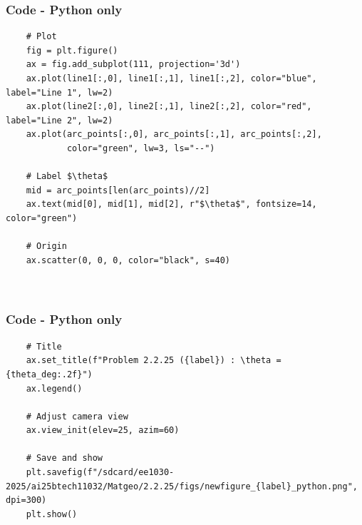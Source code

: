 \documentclass{beamer}
\theoremstyle{remark}
\numberwithin{equation}{section}
\begin{document}
\begin{frame}[fragile]
\frametitle{Code - Python only}
\begin{lstlisting}
    # Plot
    fig = plt.figure()
    ax = fig.add_subplot(111, projection='3d')
    ax.plot(line1[:,0], line1[:,1], line1[:,2], color="blue", label="Line 1", lw=2)
    ax.plot(line2[:,0], line2[:,1], line2[:,2], color="red", label="Line 2", lw=2)
    ax.plot(arc_points[:,0], arc_points[:,1], arc_points[:,2],
            color="green", lw=3, ls="--")

    # Label $\theta$
    mid = arc_points[len(arc_points)//2]
    ax.text(mid[0], mid[1], mid[2], r"$\theta$", fontsize=14, color="green")

    # Origin
    ax.scatter(0, 0, 0, color="black", s=40)



\end{lstlisting}
\end{frame}

\begin{frame}[fragile]
\frametitle{Code - Python only}
\begin{lstlisting}
    # Title
    ax.set_title(f"Problem 2.2.25 ({label}) : \theta = {theta_deg:.2f}")
    ax.legend()

    # Adjust camera view
    ax.view_init(elev=25, azim=60)

    # Save and show
    plt.savefig(f"/sdcard/ee1030-2025/ai25btech11032/Matgeo/2.2.25/figs/newfigure_{label}_python.png", dpi=300)
    plt.show()



\end{lstlisting}
\end{frame}
\end{document}
